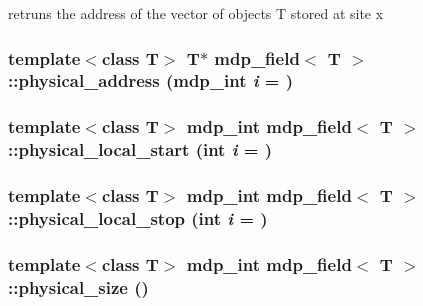 retruns the address of the vector of objects T stored at site x \hypertarget{classmdp__field_a345bb93496b3154b4349878d02ab0a2a}{
\subsubsection[{physical\_\-address}]{\setlength{\rightskip}{0pt plus 5cm}template$<$class T$>$ T$\ast$ {\bf mdp\_\-field}$<$ T $>$::physical\_\-address ({\bf mdp\_\-int} {\em i} = {})}}
\label{classmdp__field_a345bb93496b3154b4349878d02ab0a2a}
\hypertarget{classmdp__field_a58b111a6f42e6b3807c6e333fc080020}{
\subsubsection[{physical\_\-local\_\-start}]{\setlength{\rightskip}{0pt plus 5cm}template$<$class T$>$ {\bf mdp\_\-int} {\bf mdp\_\-field}$<$ T $>$::physical\_\-local\_\-start (int {\em i} = {})}}
\label{classmdp__field_a58b111a6f42e6b3807c6e333fc080020}
\hypertarget{classmdp__field_afc3c5a4aa6512d4b99f08ae58d7e50a7}{
\subsubsection[{physical\_\-local\_\-stop}]{\setlength{\rightskip}{0pt plus 5cm}template$<$class T$>$ {\bf mdp\_\-int} {\bf mdp\_\-field}$<$ T $>$::physical\_\-local\_\-stop (int {\em i} = {})}}
\label{classmdp__field_afc3c5a4aa6512d4b99f08ae58d7e50a7}
\hypertarget{classmdp__field_a0f6da321ba9bdae3a571dbbe5087d799}{
\subsubsection[{physical\_\-size}]{\setlength{\rightskip}{0pt plus 5cm}template$<$class T$>$ {\bf mdp\_\-int} {\bf mdp\_\-field}$<$ T $>$::physical\_\-size ()}}
